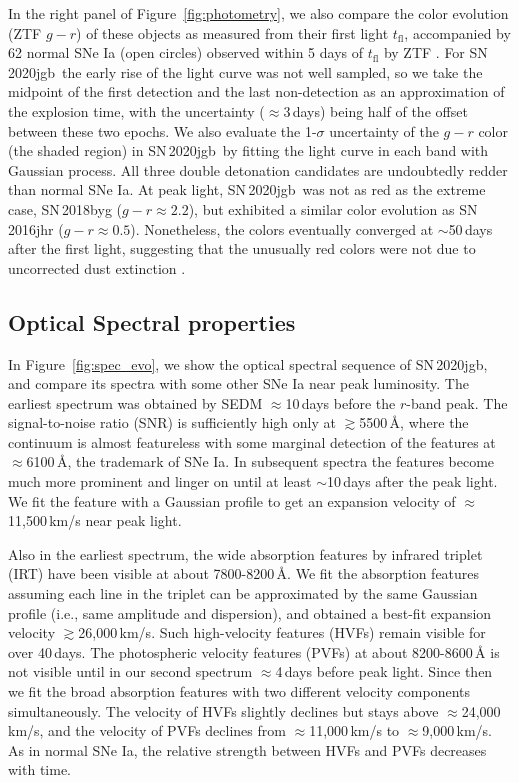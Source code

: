 \documentclass[twocolumn]{aastex631}
\newcommand\sn{SN\,2020jgb}
\begin{document}
In the right panel of Figure~\ref{fig:photometry}, we also compare the color evolution (ZTF $g-r$) of these objects as measured from their first light $t_\mathrm{fl}$, accompanied by 62 normal SNe Ia (open circles) observed within 5 days of $t_\mathrm{fl}$ by ZTF \citep[from][]{Bulla2020}. For \sn\, the early rise of the light curve was not well sampled, so we take the midpoint of the first detection and the last non-detection as an approximation of the explosion time, with the uncertainty ($\approx$3\,days) being half of the offset between these two epochs. We also evaluate the 1-$\sigma$ uncertainty of the $g-r$ color (the shaded region) in \sn\ by fitting the light curve in each band with Gaussian process. All three double detonation candidates are undoubtedly redder than normal SNe Ia. At peak light, \sn\ was not as red as the extreme case, SN\,2018byg ($g-r\approx2.2$), but exhibited a similar color evolution as SN\,2016jhr ($g-r\approx0.5$). Nonetheless, the colors eventually converged at $\sim$50\,days after the first light, suggesting that the unusually red colors were not due to uncorrected dust extinction \citep{de_18byg_2019}.

\subsection{Optical Spectral properties}
In Figure~\ref{fig:spec_evo}, we show the optical spectral sequence of \sn, and compare its spectra with some other SNe Ia near peak luminosity. The earliest spectrum was obtained by SEDM $\approx$10\,days before the $r$-band peak. The signal-to-noise ratio (SNR) is sufficiently high only at $\gtrsim$5500\,\r{A}, where the continuum is almost featureless with some marginal detection of the  features at $\approx$6100\,\r{A}, the trademark of SNe Ia. In subsequent spectra the  features become much more prominent and linger on until at least $\sim$10\,days after the peak light. We fit the  feature with a Gaussian profile to get an expansion velocity of $\approx$11,500\,km/s near peak light. 

Also in the earliest spectrum, the wide absorption features by  infrared triplet (IRT) have been visible at about 7800-8200\,\r{A}. We fit the absorption features assuming each line in the triplet can be approximated by the same Gaussian profile (i.e., same amplitude and dispersion), and obtained a best-fit expansion velocity $\gtrsim$26,000\,km/s. Such high-velocity features (HVFs) remain visible for over 40\,days. The photospheric velocity features (PVFs) at about 8200-8600\,\r{A} is not visible until in our second spectrum $\approx$4\,days before peak light. Since then we fit the broad absorption features with two different velocity components simultaneously. The velocity of HVFs slightly declines but stays above $\approx$24,000\,km/s, and the velocity of PVFs declines from $\approx$11,000\,km/s to $\approx$9,000\,km/s. As in normal SNe Ia, the relative strength between HVFs and PVFs decreases with time.
\end{document}
